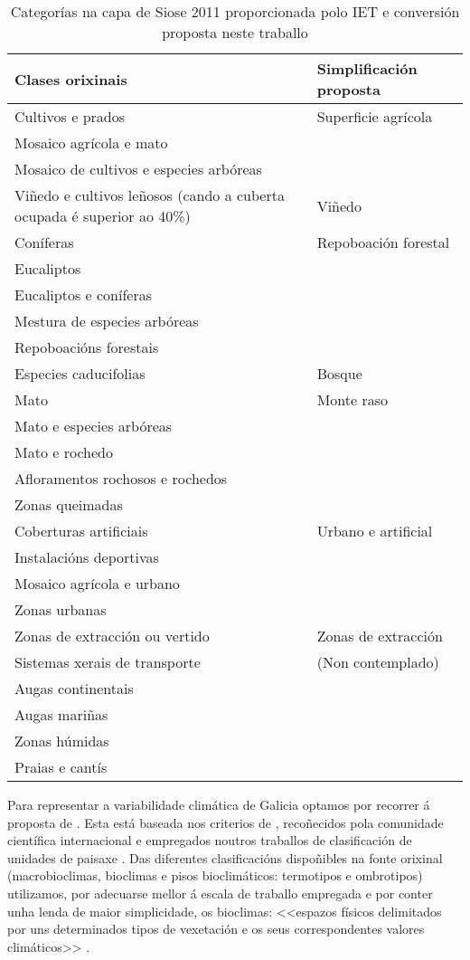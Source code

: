 \documentclass[11pt,a4paper]{article}
\begin{document}
\begin{table}
\caption{Categorías na capa de Siose 2011 proporcionada polo IET e conversión proposta neste traballo} \label{cadroSIOSE}
\begin{center}
\begin{tabular}{p{}l}
\toprule
Clases orixinais & Simplificación proposta \\
\midrule
Cultivos e prados & Superficie agrícola \\
Mosaico agrícola e mato &  \\
Mosaico de cultivos e especies arbóreas &  \\
\midrule
Viñedo e cultivos leñosos (cando a cuberta ocupada é superior ao 40\%) & Viñedo \\
\midrule
Coníferas & Repoboación forestal \\
Eucaliptos &  \\
Eucaliptos e coníferas &  \\
Mestura de especies arbóreas & \\
Repoboacións forestais &  \\
\midrule
Especies caducifolias & Bosque \\
\midrule
Mato & Monte raso\\
Mato e especies arbóreas &  \\
Mato e rochedo &  \\
Afloramentos rochosos e rochedos &  \\
Zonas queimadas &  \\
\midrule
Coberturas artificiais & Urbano e artificial \\
Instalacións deportivas &  \\
Mosaico agrícola e urbano &  \\
Zonas urbanas &  \\
\midrule
Zonas de extracción ou vertido &  Zonas de extracción\\
\midrule
Sistemas xerais de transporte &  (Non contemplado)\\
Augas continentais &  \\
Augas mariñas &  \\
Zonas húmidas &  \\
Praias e cantís &  \\
\bottomrule
\end{tabular}
\end{center}
\end{table}




Para representar a variabilidade climática de Galicia optamos por recorrer á proposta de \citet{Rodriguez2007}. Esta está baseada nos criterios de \citet{RivasMartinez2015}, recoñecidos pola comunidade científica internacional e empregados noutros traballos de clasificación de unidades de paisaxe \citep[p.ex. ][]{Capotorti2012174}. Das diferentes clasificacións dispoñibles na fonte orixinal (macrobioclimas, bioclimas e pisos bioclimáticos: termotipos e ombrotipos) utilizamos, por adecuarse mellor á escala de traballo empregada e por conter unha lenda de maior simplicidade, os bioclimas: <<espazos físicos delimitados por uns determinados tipos de vexetación e os seus correspondentes valores climáticos>> \citep{RivasMartinez2015}. 
\end{document}
